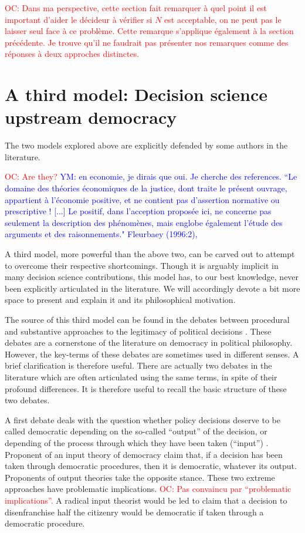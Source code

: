 \documentclass[preprint, french, english, 11pt]{elsarticle}%
\newcommand{\commentYM}[1]{\textcolor{blue}{YM: #1}}
\newcommand{\commentOC}[1]{\textcolor{red}{OC: #1}}
\begin{document}
\commentOC{Dans ma perspective, cette section fait remarquer à quel point il est important d’aider le décideur à vérifier si $N$ est acceptable, on ne peut pas le laisser seul face à ce problème. Cette remarque s’applique également à la section précédente. Je trouve qu’il ne faudrait pas présenter nos remarques comme des réponses à deux approches distinctes.}

\section{A third model: Decision science upstream democracy}
\noindent The two models explored above are explicitly defended by some authors in the literature. 

\commentOC{ Are they?}
\commentYM{en economie, je dirais que oui. Je cherche des references.
“Le domaine des théories économiques de la justice, dont traite le présent ouvrage, appartient
à l’économie positive, et ne contient pas d’assertion normative ou prescriptive ! [...] Le positif,
dans l’acception proposée ici, ne concerne pas seulement la description des phénomènes, mais englobe
également l’étude des arguments et des raisonnements." Fleurbaey (1996:2),} 

A third model, more powerful than the above two, can be carved out to attempt to overcome their respective shortcomings. Though it is arguably implicit in many decision science contributions, this model has, to our best knowledge, never been explicitly articulated in the literature. We will accordingly devote a bit more space to present and explain it and its philosophical motivation.

The source of this third model can be found in the debates between procedural and substantive approaches to the legitimacy of political decisions \cite{meinard_what_2017}. These debates are a cornerstone of the literature on democracy in political philosophy. However, the key-terms of these debates are sometimes used in different senses. A brief clarification is therefore useful. There are actually two debates in the literature which are often articulated using the same terms, in spite of their profound differences. It is therefore useful to recall the basic structure of these two debates.

A first debate deals with the question whether policy decisions deserve to be called democratic depending on the so-called “output” of the decision, or depending of the process through which they have been taken (“input”) \cite{vatn_environmental_2016, backstrand_environmental_2010}. Proponent of an input theory of democracy claim that, if a decision has been taken through democratic procedures, then it is democratic, whatever its output. Proponents of output theories take the opposite stance. These two extreme approaches have problematic implications. \commentOC{Pas convaincu par “problematic implications”.} A radical input theorist would be led to claim that a decision to disenfranchise half the citizenry would be democratic if taken through a democratic procedure. 
\end{document}

